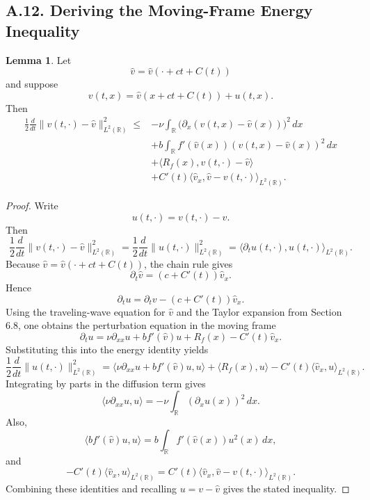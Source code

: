 \documentclass[11pt]{article}
\theoremstyle{definition}
\newtheorem{lemma}{Lemma}
\theoremstyle{remark}
\begin{document}
\subsection*{A.12. Deriving the Moving-Frame Energy Inequality}
\begin{lemma}
Let
\[
\hat v=\hat v(\cdot+ct+C(t))
\]
and suppose
\[
v(t,x)=\hat v(x+ct+C(t))+u(t,x).
\]
Then
\[
\begin{aligned}
\frac12\frac{d}{dt}\|v(t,\cdot)-\hat v\|_{L^2(\mathbb R)}^2
\leq{}&-\nu\int_{\mathbb R}\bigl(\partial_x(v(t,x)-\hat v(x))\bigr)^2\,dx \\
&+b\int_{\mathbb R} f'(\hat v(x))(v(t,x)-\hat v(x))^2\,dx \\
&+\langle R_f(x),v(t,\cdot)-\hat v\rangle \\
&+C'(t)\langle \hat v_x,\hat v-v(t,\cdot)\rangle_{L^2(\mathbb R)}.
\end{aligned}
\]
\end{lemma}

\begin{proof}
Write
\[
u(t,\cdot)=v(t,\cdot)-\hat v.
\]
Then
\[
\frac12\frac{d}{dt}\|v(t,\cdot)-\hat v\|_{L^2(\mathbb R)}^2
=
\frac12\frac{d}{dt}\|u(t,\cdot)\|_{L^2(\mathbb R)}^2
=
\langle \partial_t u(t,\cdot),u(t,\cdot)\rangle_{L^2(\mathbb R)}.
\]
Because $\hat v=\hat v(\cdot+ct+C(t))$, the chain rule gives
\[
\partial_t \hat v=(c+C'(t))\hat v_x.
\]
Hence
\[
\partial_t u=\partial_t v-(c+C'(t))\hat v_x.
\]
Using the traveling-wave equation for $\hat v$ and the Taylor expansion from Section 6.8, one obtains the perturbation equation in the moving frame
\[
\partial_t u
=
\nu\partial_{xx}u+b f'(\hat v)u+R_f(x)-C'(t)\hat v_x.
\]
Substituting this into the energy identity yields
\[
\frac12\frac{d}{dt}\|u(t,\cdot)\|_{L^2(\mathbb R)}^2
=
\langle \nu\partial_{xx}u+b f'(\hat v)u,u\rangle
+\langle R_f(x),u\rangle
-C'(t)\langle \hat v_x,u\rangle_{L^2(\mathbb R)}.
\]
Integrating by parts in the diffusion term gives
\[
\langle \nu\partial_{xx}u,u\rangle
=
-\nu\int_{\mathbb R}(\partial_x u(x))^2\,dx.
\]
Also,
\[
\langle b f'(\hat v)u,u\rangle
=
b\int_{\mathbb R} f'(\hat v(x))u^2(x)\,dx,
\]
and
\[
-C'(t)\langle \hat v_x,u\rangle_{L^2(\mathbb R)}
=
C'(t)\langle \hat v_x,\hat v-v(t,\cdot)\rangle_{L^2(\mathbb R)}.
\]
Combining these identities and recalling $u=v-\hat v$ gives the stated inequality.
\end{proof}
\end{document}
